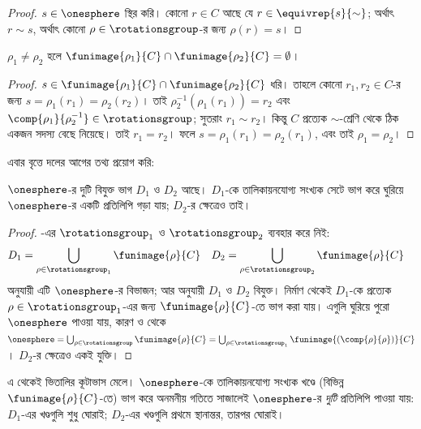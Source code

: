 \documentclass[../../../include/open-logic-section]{subfiles}
\begin{document}
\begin{proof}
$s\in\onesphere$ স্থির করি। কোনো
$r\in C$ আছে যে $r\in\equivrep{s}{\sim}$;
অর্থাৎ $r\sim s$, অর্থাৎ কোনো
$\rho\in\rotationsgroup$-র জন্য
$\rho(r)=s$।
\end{proof}

\begin{lem}
$\rho_1\neq\rho_2$ হলে
$\funimage{\rho_1}{C}\cap
\funimage{\rho_2}{C}=\emptyset$।
\end{lem}

\begin{proof}
$s\in\funimage{\rho_{1}}{C}\cap
\funimage{\rho_{2}}{C}$ ধরি। তাহলে কোনো
$r_{1},r_{2}\in C$-র জন্য
$s=\rho_{1}(r_{1})=\rho_{2}(r_{2})$। তাই
$\rho^{-1}_2(\rho_1(r_1))=r_2$ এবং
$\comp{\rho_1}{\rho^{-1}_2}
\in\rotationsgroup$; সুতরাং
$r_{1}\sim r_{2}$। কিন্তু $C$ প্রত্যেক
$\sim$-শ্রেণি থেকে ঠিক একজন সদস্য বেছে
নিয়েছে। তাই $r_1=r_2$। ফলে
$s=\rho_1(r_1)=\rho_2(r_1)$,
এবং তাই $\rho_1=\rho_2$।
\end{proof}

এবার বৃত্তে দলের আগের তথ্য প্রয়োগ করি:

\begin{lem}
$\onesphere$-র দুটি বিযুক্ত ভাগ
$D_{1}$ ও $D_{2}$ আছে। $D_{1}$-কে
তালিকায়নযোগ্য সংখ্যক সেটে ভাগ করে
ঘুরিয়ে $\onesphere$-র একটি প্রতিলিপি
গড়া যায়; $D_{2}$-র ক্ষেত্রেও তাই।
\end{lem}

\begin{proof}
-এর
$\rotationsgroup_{1}$ ও
$\rotationsgroup_2$ ব্যবহার করে নিই:
\begin{align*}
	D_{1} &= \bigcup_{\rho \in \rotationsgroup_1} \funimage{\rho}{C} &
	D_{2} &= \bigcup_{\rho \in \rotationsgroup_2} \funimage{\rho}{C}
\end{align*}
 অনুযায়ী এটি
$\onesphere$-র বিভাজন; আর
 অনুযায়ী
$D_1$ ও $D_2$ বিযুক্ত। নির্মাণ থেকেই
$D_1$-কে প্রত্যেক
$\rho\in\rotationsgroup_1$-এর জন্য
$\funimage{\rho}{C}$-তে ভাগ করা যায়।
এগুলি ঘুরিয়ে পুরো $\onesphere$ পাওয়া যায়,
কারণ  ও
 থেকে
$\onesphere=\bigcup_{\rho\in
\rotationsgroup}\funimage{\rho}{C}=
\bigcup_{\rho\in\rotationsgroup_1}
\funimage{(\comp{\rho}{\rho})}{C}$।
$D_2$-র ক্ষেত্রেও একই যুক্তি।
\end{proof}\noindent
এ থেকেই ভিতালির কূটাভাস মেলে।
$\onesphere$-কে তালিকায়নযোগ্য সংখ্যক
খণ্ডে (বিভিন্ন $\funimage{\rho}{C}$-তে)
ভাগ করে অনমনীয় গতিতে সাজালেই
$\onesphere$-র \emph{দুটি} প্রতিলিপি
পাওয়া যায়: $D_1$-এর খণ্ডগুলি শুধু
ঘোরাই; $D_2$-এর খণ্ডগুলি প্রথমে
স্থানান্তর, তারপর ঘোরাই।
\end{document}
